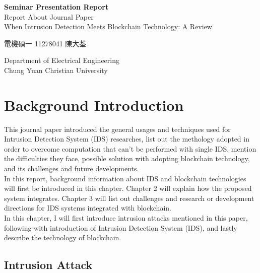 \documentclass[12pt]{report}
\begin{document}
\begin{titlepage}
    \begin{center}
        \vspace*{2cm}
        \Large
        \textbf{Seminar Presentation Report} \\
        \vspace{1.5cm}
        Report About Journal Paper \cite{8274922} \\
		When Intrusion Detection Meets Blockchain Technology: A Review
        \vspace{1.5cm}
		\begin{CJK*}{UTF8}{bsmi}
        電機碩一 11278041 陳大荃
		\end{CJK*}
        \vfill
        Department of Electrical Engineering\\
        \vspace{0.2cm}
        Chung Yuan Christian University\\
        \vspace{0.2cm}
		\date{\today}
        \normalsize
    \end{center}
\end{titlepage}
\tableofcontents
\listoffigures
\listoftables

\chapter{Background Introduction}
This journal paper introduced the general usages and techniques used for Intrusion Detection System (IDS) researches, list out the methology adopted in order to overcome computation that can't be performed with single IDS, mention the difficulties they face, possible solution with adopting blockchain technology, and its challenges and future developments. \\

In this report, background information about IDS and blockchain technologies will first be introduced in this chapter. Chapter 2 will explain how the proposed system integrates. Chapter 3 will list out challenges and research or development directions for IDS systems integrated with blockchain. \\

In this chapter, I will first introduce intrusion attacks mentioned in this paper, following with introduction of Intrusion Detection System (IDS), and lastly describe the technology of blockchain. 

\section{Intrusion Attack}
\end{document}
